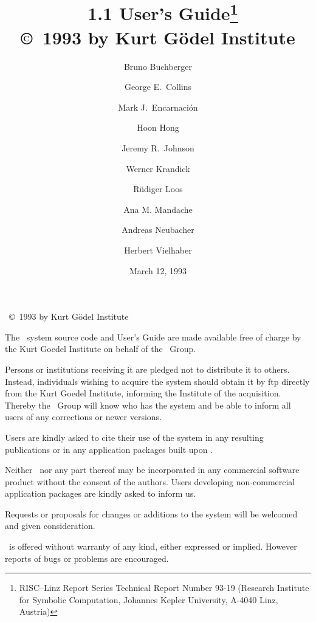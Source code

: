 \documentclass{report}
\begin{document}
\title{
\saclib\ 1.1 User's Guide\thanks{
  RISC--Linz Report Series Technical Report Number 93-19
  (Research Institute for Symbolic Computation, Johannes Kepler University,
  A-4040 Linz, Austria)
}
\\\bigskip \small
\copyright\ 1993 by Kurt G\"{o}del Institute
}

\author{
Bruno Buchberger \and George E.\ Collins \and Mark J.\ Encarnaci\'{o}n \and
Hoon Hong \and Jeremy R.\ Johnson \and Werner Krandick \and R\"{u}diger Loos
\and Ana M. Mandache \and Andreas Neubacher \and Herbert Vielhaber
}

\date{March 12, 1993}
\maketitle


\clearpage \vfill
\begin{center}
  \saclib\ \copyright\ 1993 by Kurt G\"{o}del Institute
\end{center}

\bigskip

The \saclib\ system source code and User's Guide are made available free
of charge by the Kurt Goedel Institute on behalf of the \saclib\ Group.

Persons or institutions receiving it are pledged not to distribute it to
others.  Instead, individuals wishing to acquire the system should obtain it
by ftp directly from the Kurt Goedel Institute, informing the Institute of
the acquisition.  Thereby the \saclib\ Group will know who has the system and
be able to inform all users of any corrections or newer versions.

Users are kindly asked to cite their use of the system in any resulting
publications or in any application packages built upon \saclib.

Neither \saclib\ nor any part thereof may be incorporated in any commercial
software product without the consent of the authors.  Users developing
non-commercial application packages are kindly asked to inform us.

Requests or proposals for changes or additions to the system will
be welcomed and given consideration.

\saclib\ is offered without warranty of any kind, either expressed or implied.
However reports of bugs or problems are encouraged.
\end{document}
